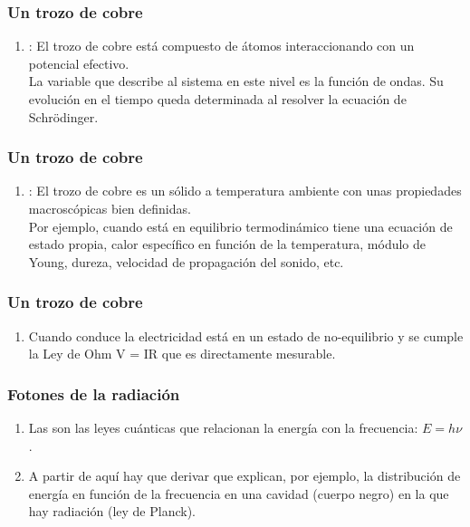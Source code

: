 \documentclass[12pt]{beamer}
\begin{document}
\begin{frame}
\frametitle{Un trozo de cobre}
\begin{enumerate}[<+->]
\item {}: \pause El trozo de cobre está compuesto de átomos interaccionando con un potencial efectivo.
\\
La variable que describe al sistema en este nivel es la función de ondas. Su evolución en el tiempo queda determinada al resolver la ecuación de Schrödinger.
\seti
\end{enumerate}
\end{frame}
\begin{frame}
\frametitle{Un trozo de cobre}
\begin{enumerate}[<+->]
\conti
\item {}:  \pause El trozo de cobre es un sólido a temperatura ambiente con unas propiedades macroscópicas bien definidas.
\\
Por ejemplo, \pause cuando está en equilibrio termodinámico tiene una ecuación de estado propia, \pause calor específico en función de la temperatura, \pause módulo de Young, \pause dureza, \pause velocidad de propagación del sonido, etc. 
\seti
\end{enumerate}
\end{frame}
\begin{frame}
\frametitle{Un trozo de cobre}
\begin{enumerate}[<+->]
\conti
\item Cuando conduce la electricidad está en un estado de no-equilibrio y se cumple la Ley de Ohm V = IR que es directamente mesurable.
\end{enumerate}
\end{frame}
\begin{frame}
\frametitle{Fotones de la radiación}
\begin{enumerate}[<+->]
\item Las  son las leyes cuánticas que relacionan la energía con la frecuencia: $E = h \nu$.
\item A partir de aquí hay que derivar  que explican, \pause por ejemplo, la distribución de energía en función de la frecuencia en una cavidad (cuerpo negro) en la que hay radiación (ley de Planck).
\end{enumerate}
\end{frame}
\end{document}
